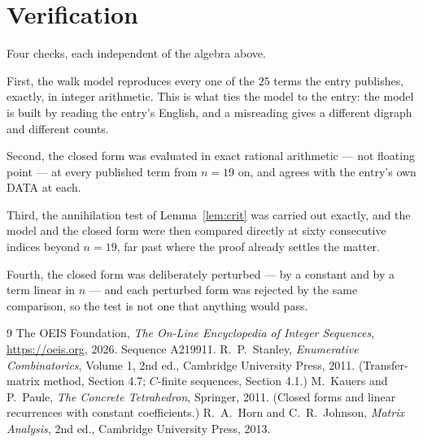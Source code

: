 \documentclass[11pt,a4paper]{article}
\theoremstyle{plain}
\theoremstyle{definition}
\begin{document}
\section{Verification}

Four checks, each independent of the algebra above.

First, the walk model reproduces every one of the $25$ terms the entry publishes,
exactly, in integer arithmetic. This is what ties the model to the entry: the model is built
by reading the entry's English, and a misreading gives a different digraph and different
counts.

Second, the closed form was evaluated in exact rational arithmetic --- not floating point ---
at every published term from $n=19$ on, and agrees with the entry's own DATA at each.

Third, the annihilation test of Lemma~\ref{lem:crit} was carried out exactly, and the model
and the closed form were then compared directly at sixty consecutive indices beyond
$n=19$, far past where the proof already settles the matter.

Fourth, the closed form was deliberately perturbed --- by a constant and by a term linear in
$n$ --- and each perturbed form was rejected by the same comparison, so the test is not one
that anything would pass.

\begin{thebibliography}{9}
 The OEIS Foundation, \emph{The On-Line Encyclopedia of Integer
Sequences}, \url{https://oeis.org}, 2026. Sequence A219911.
 R.~P.~Stanley, \emph{Enumerative Combinatorics}, Volume 1, 2nd ed.,
Cambridge University Press, 2011. (Transfer-matrix method, Section 4.7; $C$-finite sequences,
Section 4.1.)
 M.~Kauers and P.~Paule, \emph{The Concrete Tetrahedron}, Springer, 2011.
(Closed forms and linear recurrences with constant coefficients.)
 R.~A.~Horn and C.~R.~Johnson, \emph{Matrix Analysis}, 2nd ed., Cambridge
University Press, 2013.
\end{thebibliography}
\end{document}
